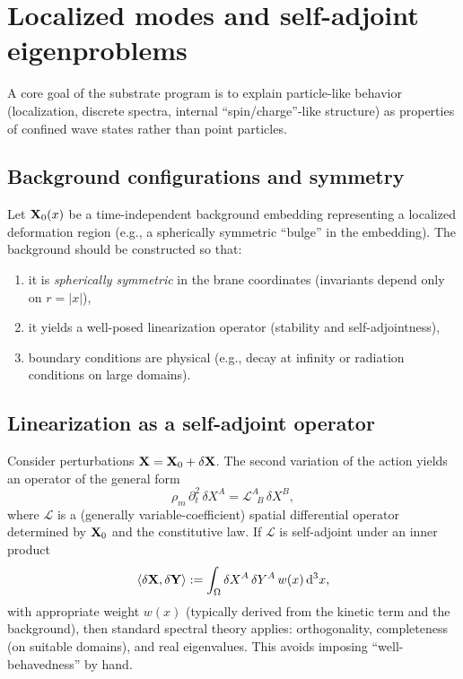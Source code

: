 \section{Localized modes and self-adjoint eigenproblems}
\label{sec:localized}

A core goal of the substrate program is to explain particle-like behavior (localization, discrete spectra,
internal ``spin/charge''-like structure) as properties of confined wave states rather than point particles.

\subsection{Background configurations and symmetry}

Let $\mathbf{X}_0(x)$ be a time-independent background embedding representing a localized deformation region
(e.g., a spherically symmetric ``bulge'' in the embedding). The background should be constructed so that:
\begin{enumerate}
\item it is \emph{spherically symmetric} in the brane coordinates (invariants depend only on $r=|x|$),
\item it yields a well-posed linearization operator (stability and self-adjointness),
\item boundary conditions are physical (e.g., decay at infinity or radiation conditions on large domains).
\end{enumerate}

\subsection{Linearization as a self-adjoint operator}

Consider perturbations $\mathbf{X}=\mathbf{X}_0+\delta\mathbf{X}$.
The second variation of the action yields an operator of the general form
\begin{equation}
  \rho_m\,\partial_t^2\,\delta X^A = \mathcal{L}^A_{\;\;B}\,\delta X^B,
  \label{eq:linearized-operator}
\end{equation}
where $\mathcal{L}$ is a (generally variable-coefficient) spatial differential operator determined by
$\mathbf{X}_0$ and the constitutive law. If $\mathcal{L}$ is self-adjoint under an inner product
\begin{equation}
  \langle \delta\mathbf{X}, \delta\mathbf{Y}\rangle := \int_\Omega \delta X^A\,\delta Y^A\, w(x)\,\mathrm{d}^3x,
  \label{eq:inner-product}
\end{equation}
with appropriate weight $w(x)$ (typically derived from the kinetic term and the background),
then standard spectral theory applies: orthogonality, completeness (on suitable domains), and real eigenvalues.
This avoids imposing ``well-behavedness'' by hand.

